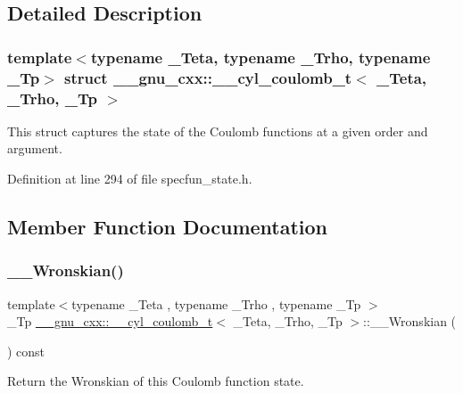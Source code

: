 \subsection{Detailed Description}
\subsubsection*{template$<$typename \+\_\+\+Teta, typename \+\_\+\+Trho, typename \+\_\+\+Tp$>$\newline
struct \+\_\+\+\_\+gnu\+\_\+cxx\+::\+\_\+\+\_\+cyl\+\_\+coulomb\+\_\+t$<$ \+\_\+\+Teta, \+\_\+\+Trho, \+\_\+\+Tp $>$}

This struct captures the state of the Coulomb functions at a given order and argument. 

Definition at line 294 of file specfun\+\_\+state.\+h.



\subsection{Member Function Documentation}
\mbox{\label{struct____gnu__cxx_1_1____cyl__coulomb__t_a7ce3df5dd80026df89e43b37c9efe36f}} 
\subsubsection{\texorpdfstring{\+\_\+\+\_\+\+Wronskian()}{\_\_Wronskian()}}
{\footnotesize\ttfamily template$<$typename \+\_\+\+Teta , typename \+\_\+\+Trho , typename \+\_\+\+Tp $>$ \\
\+\_\+\+Tp \hyperlink{struct____gnu__cxx_1_1____cyl__coulomb__t}{\+\_\+\+\_\+gnu\+\_\+cxx\+::\+\_\+\+\_\+cyl\+\_\+coulomb\+\_\+t}$<$ \+\_\+\+Teta, \+\_\+\+Trho, \+\_\+\+Tp $>$\+::\+\_\+\+\_\+\+Wronskian (\begin{DoxyParamCaption}{ }\end{DoxyParamCaption}) const\hspace{0.3cm}{\ttfamily [inline]}}



Return the Wronskian of this Coulomb function state. 



